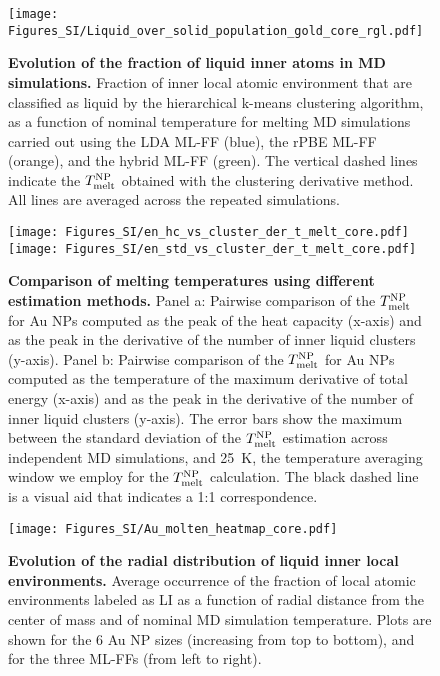 \documentclass[%
aip,
 amsmath,amssymb,
 reprint,
]{revtex4-1}
\newcommand*\subt[1]{_{\textnormal{#1}}}
\newcommand*\supt[1]{^{\textnormal{#1}}}
\begin{document}
%
\begin{figure*}[h!]
    \centering
    \texttt{[image: Figures\_SI/Liquid\_over\_solid\_population\_gold\_core\_rgl.pdf]}
    \caption{
    \textbf{Evolution of the fraction of liquid inner atoms in MD simulations.}
    Fraction of inner local atomic environment that are classified as liquid by the hierarchical k-means clustering algorithm, as a function of nominal temperature for melting MD simulations carried out using the LDA ML-FF (blue), the rPBE ML-FF (orange), and the hybrid ML-FF (green).
    The vertical dashed lines indicate the $T\subt{melt}\supt{NP}$ obtained with the clustering derivative method.
    All lines are averaged across the repeated simulations.
}
    \label{fig:meltingg}
\end{figure*}
%
\begin{figure}[!hb]
    \centering
    \texttt{[image: Figures\_SI/en\_hc\_vs\_cluster\_der\_t\_melt\_core.pdf]}
    \texttt{[image: Figures\_SI/en\_std\_vs\_cluster\_der\_t\_melt\_core.pdf]}
    \caption{
    \textbf{Comparison of melting temperatures using different estimation methods.}
    Panel a: Pairwise comparison of the $T\subt{melt}\supt{NP}$ for Au NPs computed as the peak of the heat capacity (x-axis) and as the peak in the derivative of the number of inner liquid clusters (y-axis).
    Panel b: Pairwise comparison of the $T\subt{melt}\supt{NP}$ for Au NPs computed as the temperature of the maximum derivative of total energy (x-axis) and as the peak in the derivative of the number of inner liquid clusters (y-axis).
    The error bars show the maximum between the standard deviation of the  $T\subt{melt}\supt{NP}$ estimation across independent MD simulations, and 25~K, the temperature averaging window we employ for the  $T\subt{melt}\supt{NP}$ calculation.
    The black dashed line is a visual aid that indicates a 1:1 correspondence.
}
    \label{fig:melting_t_scatter}
\end{figure}
%
\begin{figure*}[!htb]
    \centering
    \texttt{[image: Figures\_SI/Au\_molten\_heatmap\_core.pdf]}
    \caption{
    \textbf{Evolution of the radial distribution of liquid inner local environments.}
    Average occurrence of the fraction of local atomic environments labeled as LI as a function of radial distance from the center of mass and of nominal MD simulation temperature.
%
    Plots are shown for the 6 Au NP sizes (increasing from top to bottom), and for the three ML-FFs (from left to right).}
    \label{fig:cluster_heatmap_core}
\end{figure*}
\end{document}
